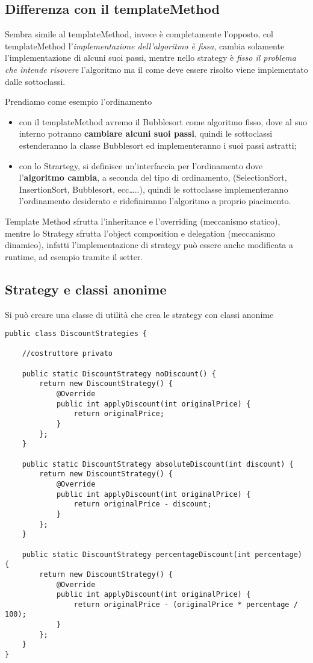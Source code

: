 \subsection{Differenza con il templateMethod}

Sembra simile al templateMethod, invece è completamente l'opposto, col templateMethod l'\textit{implementazione dell'algoritmo è fissa}, cambia solamente 
l'implementazione di alcuni suoi passi, mentre nello strategy è \textit{fisso il problema che intende risovere} l'algoritmo ma il come deve essere risolto viene 
implementato dalle sottoclassi. 
\smallskip

Prendiamo come esempio l'ordinamento

\begin{itemize}
    \item con il templateMethod avremo il Bubblesort come algoritmo fisso, dove al suo interno potranno \textbf{cambiare alcuni suoi passi}, quindi le sottoclassi
    estenderanno la classe Bubblesort ed implementeranno i suoi passi astratti;
    \item con lo Strartegy, si definisce un'interfaccia per l'ordinamento dove l'\textbf{algoritmo cambia}, a seconda del tipo di ordinamento,  
    (SelectionSort, InsertionSort, Bubblesort, ecc\dots..), quindi le sottoclasse implementeranno l'ordinamento desiderato e ridefiniranno l'algoritmo a proprio 
    piacimento.
\end{itemize}

Template Method sfrutta l’inheritance e l’overriding (meccanismo statico), mentre lo Strategy sfrutta l’object composition e delegation (meccanismo dinamico), 
infatti l’implementazione di strategy può essere anche modificata a runtime, ad esempio tramite il setter.

\subsection{Strategy e classi anonime}

Si può creare una classe di utilità che crea le strategy con classi anonime
\begin{lstlisting}
public class DiscountStrategies {

    //costruttore privato

    public static DiscountStrategy noDiscount() {
        return new DiscountStrategy() {
            @Override
            public int applyDiscount(int originalPrice) {
                return originalPrice;
            }
        };
    }

    public static DiscountStrategy absoluteDiscount(int discount) {
        return new DiscountStrategy() {
            @Override
            public int applyDiscount(int originalPrice) {
                return originalPrice - discount;
            }
        };
    }

    public static DiscountStrategy percentageDiscount(int percentage) {
        return new DiscountStrategy() {
            @Override
            public int applyDiscount(int originalPrice) {
                return originalPrice - (originalPrice * percentage / 100);
            }
        };
    }
}
\end{lstlisting}


